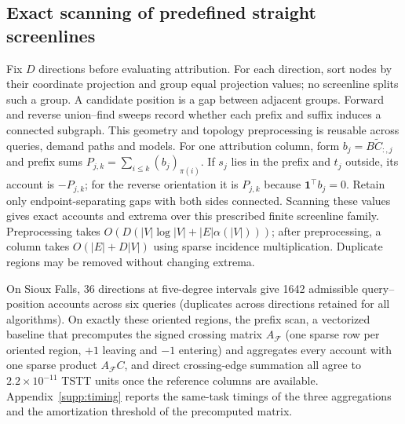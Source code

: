 \subsection{Exact scanning of predefined straight screenlines}\label{sec:scan}
Fix $D$ directions before evaluating attribution. For each direction, sort nodes by their coordinate projection and group equal projection values; no screenline splits such a group. A candidate position is a gap between adjacent groups. Forward and reverse union--find sweeps record whether each prefix and suffix induces a connected subgraph. This geometry and topology preprocessing is reusable across queries, demand paths and models.
For one attribution column, form $b_j=B\widetilde C_{:,j}$ and prefix sums $P_{j,k}=\sum_{i\leq k}(b_j)_{\pi(i)}$. If $s_j$ lies in the prefix and $t_j$ outside, its account is $-P_{j,k}$; for the reverse orientation it is $P_{j,k}$ because $\mathbf1^\top b_j=0$. Retain only endpoint-separating gaps with both sides connected. Scanning these values gives exact accounts and extrema over this prescribed finite screenline family. Preprocessing takes $O(D(|V|\log|V|+|E|\alpha(|V|)))$; after preprocessing, a column takes $O(|E|+D|V|)$ using sparse incidence multiplication. Duplicate regions may be removed without changing extrema.

On Sioux Falls, 36 directions at five-degree intervals give 1642 admissible query--position accounts across six queries (duplicates across directions retained for all algorithms). On exactly these oriented regions, the prefix scan, a vectorized baseline that precomputes the signed crossing matrix $A_{\mathcal F}$ (one sparse row per oriented region, $+1$ leaving and $-1$ entering) and aggregates every account with one sparse product $A_{\mathcal F}C$, and direct crossing-edge summation all agree to $2.2\times10^{-11}$ TSTT units once the reference columns are available. Appendix~\ref{supp:timing} reports the same-task timings of the three aggregations and the amortization threshold of the precomputed matrix.
